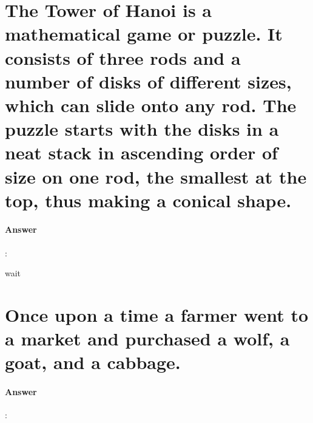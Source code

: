 \documentclass{article}
\begin{document}
\section{The Tower of Hanoi is a mathematical game or puzzle. It consists of three rods and a number of disks of different sizes, which can slide onto any rod. The puzzle starts with the disks in a neat stack in ascending order of size on one rod, the smallest at the top, thus making a conical shape.}

\paragraph{Answer}:

wait


\section{Once upon a time a farmer went to a market and purchased a wolf, a goat, and a cabbage.}

\paragraph{Answer}:
\end{document}
